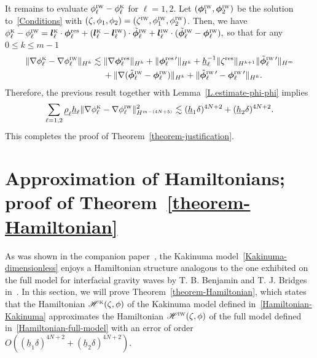 \documentclass[11pt,leqno]{article}
\numberwithin{equation}{section}
\numberwithin{figure}{section}
\begin{document}
It remains to evaluate $\phi_\ell^{\mbox{\rm\tiny IW}}-\phi_\ell^{\mbox{\rm\tiny K}}$ for $\ell=1,2$. 
Let $(\bm{\phi}_1^{\mbox{\rm\tiny IW}},\bm{\phi}_2^{\mbox{\rm\tiny IW}})$ be the solution to~\eqref{Conditions} 
with $(\zeta,\phi_1,\phi_2)=(\zeta^{\mbox{\rm\tiny IW}},\phi_1^{\mbox{\rm\tiny IW}},\phi_2^{\mbox{\rm\tiny IW}})$. 
Then, we have 
%
$
\phi_\ell^{\mbox{\rm\tiny K}}-\phi_\ell^{\mbox{\rm\tiny IW}}
= \bm{l}_\ell^{\mbox{\rm\tiny K}}\cdot\bm{\phi}_\ell^\mathrm{res}
 + (\bm{l}_\ell^{\mbox{\rm\tiny K}}-\bm{l}_\ell^{\mbox{\rm\tiny IW}})\cdot\tilde{\bm{\phi}}_\ell^{\mbox{\rm\tiny IW}}
 + \bm{l}_\ell^{\mbox{\rm\tiny IW}}\cdot(\tilde{\bm{\phi}}_\ell^{\mbox{\rm\tiny IW}}-\bm{\phi}_\ell^{\mbox{\rm\tiny IW}}),
$
%
so that for any $0\leq k\leq m-1$ 
%
\begin{align*}
\|\nabla\phi_\ell^{\mbox{\rm\tiny K}}-\nabla\phi_\ell^{\mbox{\rm\tiny IW}}\|_{H^k}
&\lesssim \|\nabla\bm{\phi}_\ell^\mathrm{res}\|_{H^k}+\|\bm{\phi}_\ell^{\mathrm{res} \, \prime}\|_{H^k}
 + \underline{h}_\ell^{-1}\|\zeta^\mathrm{res}\|_{H^{k+1}}\|\tilde{\bm{\phi}}_\ell^{\mbox{\rm\tiny IW} \, \prime}\|_{H^m} \\
&\quad\;
 + \|\nabla(\tilde{\bm{\phi}}_\ell^{\mbox{\rm\tiny IW}}-\bm{\phi}_\ell^{\mbox{\rm\tiny IW}})\|_{H^k}
 + \|\tilde{\bm{\phi}}_\ell^{\mbox{\rm\tiny IW} \, \prime}-\bm{\phi}_\ell^{\mbox{\rm\tiny IW} \, \prime}\|_{H^k}. 
\end{align*}
%
Therefore, the previous result together with Lemma~\ref{L.estimate-phi-phi} implies
%
\[
\sum_{\ell=1,2}\underline{\rho}_\ell\underline{h}_\ell
 \|\nabla\phi_\ell^{\mbox{\rm\tiny K}}-\nabla\phi_\ell^{\mbox{\rm\tiny IW}}\|_{H^{m-(4N+5)}}^2
\lesssim (\underline{h}_1\delta)^{4N+2}+(\underline{h}_2\delta)^{4N+2}.
\]
%
This completes the proof of Theorem~\ref{theorem-justification}. 


\section{Approximation of Hamiltonians; proof of Theorem~\ref{theorem-Hamiltonian}}\label{S.Hamiltonian}
%
As was shown in the companion paper~\cite[Theorem 8.4]{DucheneIguchi2020}, the Kakinuma model~\eqref{Kakinuma-dimensionless} 
enjoys a Hamiltonian structure analogous to the one exhibited on the full model for interfacial gravity waves
by T. B. Benjamin and T. J. Bridges in~\cite{BenjaminBridges1997}. 
In this section, we will prove Theorem~\ref{theorem-Hamiltonian}, which states that the Hamiltonian 
$\mathscr{H}^{\mbox{\rm\tiny K}}(\zeta,\phi)$ of the Kakinuma model defined in~\eqref{Hamiltonian-Kakinuma}
approximates
the Hamiltonian $\mathscr{H}^{\mbox{\rm\tiny IW}}(\zeta,\phi)$ of the full model defined in~\eqref{Hamiltonian-full-model}
with an error of order $O((\underline{h}_1\delta)^{4N+2}+(\underline{h}_2\delta)^{4N+2})$. 
\end{document}

